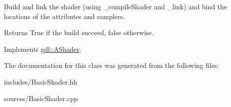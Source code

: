 Build and link the shader (using \-\_\-compile\-Shader and \-\_\-link) and bind the locations of the attributes and samplers. 

\begin{DoxyReturn}{Returns}
True if the build succeed, false otherwise. 
\end{DoxyReturn}


Implements \hyperlink{classgdl_1_1_a_shader_a0717c838d5a465332be5b91d12d2dbb5}{gdl\-::\-A\-Shader}.



The documentation for this class was generated from the following files\-:\begin{DoxyCompactItemize}
\item 
includes/Basic\-Shader.\-hh\item 
sources/Basic\-Shader.\-cpp\end{DoxyCompactItemize}
